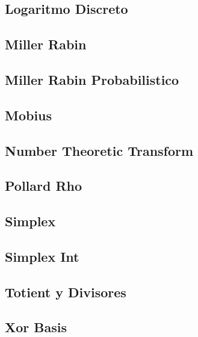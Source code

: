 \subsection{Logaritmo Discreto}
\raggedbottom
\hrulefill
\subsection{Miller Rabin}
\raggedbottom
\hrulefill
\subsection{Miller Rabin Probabilistico}
\raggedbottom
\hrulefill
\subsection{Mobius}
\raggedbottom
\hrulefill
\subsection{Number Theoretic Transform}
\raggedbottom
\hrulefill
\subsection{Pollard	Rho}
\raggedbottom
\hrulefill
\subsection{Simplex}
\raggedbottom
\hrulefill
\subsection{Simplex Int}
\raggedbottom
\hrulefill
\subsection{Totient y Divisores}
\raggedbottom
\hrulefill
\subsection{Xor Basis}
\raggedbottom
\hrulefill

